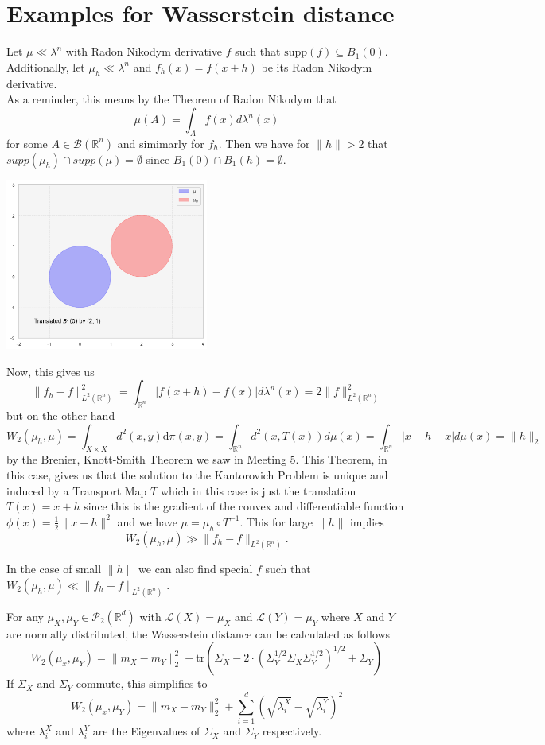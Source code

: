 \documentclass[15pt]{article}
\newcommand{\R}{\mathbb{R}}
\begin{document}
\section*{Examples for Wasserstein distance}
Let $\mu \ll \lambda^n$ with Radon Nikodym derivative $f$ such that $\text{supp}(f) \subseteq \overline{B_1(0)}$. \\ 
Additionally, let $\mu_h \ll \lambda^n$ and $f_h(x) = f(x+h)$ be its Radon Nikodym derivative. \\
As a reminder, this means by the Theorem of Radon Nikodym that $$\mu(A) = \int_{A} f(x) d\lambda^n(x)$$ for some $A \in \mathcal{B}(\R^n)$ and simimarly for $f_h$. 
Then we have for $\|h\| > 2$ that $supp(\mu_h) \cap supp(\mu) = \emptyset$ since $\overline{B_1(0)} \cap \overline{B_1(h)} = \emptyset$. 
\begin{center}
  \includegraphics*[width=0.5\textwidth]{BALL.png}  
\end{center}

Now, this gives us 
$$\|f_h-f\|^2_{L^2(\mathbb{R}^n)} = \int_{\mathbb{R}^n} |f(x+h)-f(x)| d\lambda^n(x) =2\|f\|_{L^2(\mathbb{R}^n)}^2 $$
but on the other hand $$W_2(\mu_h,\mu) = \int_{X\times X}d^2(x,y)\mathrm{d}\pi(x,y) = \int_{\R^n} d^2(x,T(x))  d\mu(x) = \int_{\R^n} |x-h+x| d\mu(x) = \|h\|_2$$ by the Brenier, Knott-Smith Theorem we saw in Meeting 5. 
This Theorem, in this case, gives us that the solution to the Kantorovich Problem is unique and induced by a Transport Map $T$ which in this case is just the translation $T(x) = x+h$ since this is the gradient of the convex and differentiable function $\phi(x) = \frac{1}{2}\|x+h\|^2$ and we have $\mu = \mu_h \circ T^{-1}$. This for large $\|h\|$ implies $$W_2(\mu_h,\mu) \gg \|f_h-f\|_{L^2(\mathbb{R}^n)}.$$ 

In the case of small $\|h\|$ we can also find special $f$ such that $W_2(\mu_h,\mu) \ll \|f_h-f\|_{L^2(\mathbb{R}^n)}$. 

\bigbreak
For any $\mu_X,\mu_Y \in \mathcal{P}_2(\mathbb{R}^d)$ with $\mathcal{L}(X) = \mu_X$ and $\mathcal{L}(Y) = \mu_Y$ where $X$ and $Y$ are normally distributed, 
the Wasserstein distance can be calculated as follows $$W_2(\mu_x,\mu_Y) = \|m_X-m_Y\|_2^2 + \text{tr}\left(\Sigma_X-2 \cdot \left(\Sigma_Y^{1/2}\Sigma_X\Sigma_Y^{1/2}\right)^{1/2}+\Sigma_Y\right)$$
If $\Sigma_X$ and $\Sigma_Y$ commute, this simplifies to $$W_2(\mu_x,\mu_Y) = \|m_X-m_Y\|_2^2 + \sum_{i = 1}^d \left( \sqrt{\lambda_i^X} - \sqrt{\lambda_i^Y}  \right)^2$$
where $\lambda_i^X$ and $\lambda_i^Y$ are the Eigenvalues of $\Sigma_X$ and $\Sigma_Y$ respectively. 
\end{document}
